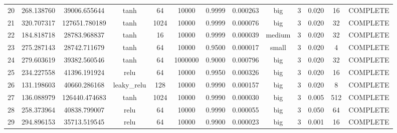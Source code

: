\begin{longtable}{ccccccccccccc}
                       20 &                 268.138760 &                       39006.655644 &            tanh &          64 &        10000 & 0.9999 &       0.000263 &       big &             3 & 0.020 &          16 & COMPLETE \\
                       21 &                 320.707317 &                      127651.780189 &            tanh &        1024 &        10000 & 0.9999 &       0.000076 &       big &             3 & 0.020 &          32 & COMPLETE \\
                       22 &                 184.818718 &                       28783.968837 &            tanh &          16 &        10000 & 0.9999 &       0.000039 &    medium &             3 & 0.020 &          32 & COMPLETE \\
                       23 &                 275.287143 &                       28742.711679 &            tanh &          64 &        10000 & 0.9500 &       0.000017 &     small &             3 & 0.020 &           4 & COMPLETE \\
                       24 &                 279.603619 &                       39382.560546 &            tanh &          64 &      1000000 & 0.9000 &       0.000796 &       big &             3 & 0.020 &          32 & COMPLETE \\
                       25 &                 234.227558 &                       41396.191924 &            relu &          64 &        10000 & 0.9950 &       0.000326 &       big &             3 & 0.020 &          16 & COMPLETE \\
                       26 &                 131.198603 &                       40660.286168 &     leaky\_relu &         128 &        10000 & 0.9990 &       0.000157 &       big &             3 & 0.020 &           8 & COMPLETE \\
                       27 &                 136.088979 &                      126440.474683 &            tanh &        1024 &        10000 & 0.9990 &       0.000030 &       big &             3 & 0.005 &         512 & COMPLETE \\
                       28 &                 258.373964 &                       40838.799007 &            relu &          64 &        10000 & 0.9990 &       0.000055 &       big &             3 & 0.050 &          64 & COMPLETE \\
                       29 &                 294.896153 &                       35713.519545 &            relu &          64 &        10000 & 0.9900 &       0.000023 &       big &             3 & 0.001 &          16 & COMPLETE \\

\end{longtable}

